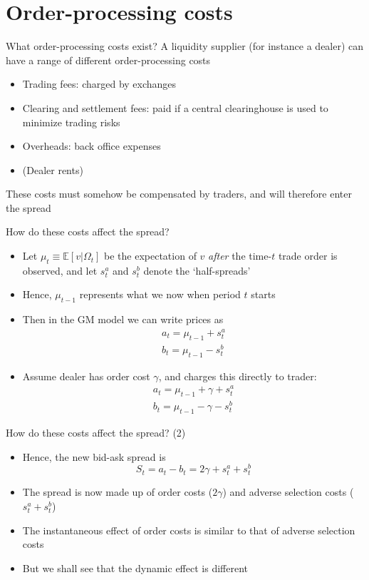 \documentclass[english,10pt]{beamer}
\begin{document}
\section{Order-processing costs}

\begin{frame}{What order-processing costs exist?}
	A liquidity supplier (for instance a dealer) can have a range of different order-processing costs
	\begin{itemize}
		\item Trading fees:  charged by exchanges
		\item Clearing and settlement fees:  paid if a central clearinghouse is used to minimize trading risks
		\item Overheads: back office expenses
		\item (Dealer rents)
	\end{itemize}
	These costs must somehow be compensated by traders, and will therefore enter the spread
\end{frame}


\begin{frame}{How do these costs affect the spread?}
	\begin{itemize}
		\item Let $\mu_t \equiv \mathbb{E}[v | \Omega_t]$ be the expectation of $v$ \textit{after} the time-$t$ trade order is observed, and let $s^a_t$ and $s^b_t$ denote the `half-spreads'
		\item Hence, $\mu_{t-1}$ represents what we now when period $t$ starts
		\item  Then in the GM model  we can write prices as
		\begin{align*}
		a_{t} = \mu_{t-1} +s^{a}_{t} \\
		b_{t} = \mu_{t-1} - s^{b}_{t}
		\end{align*}
		\item Assume dealer has order cost $\gamma$, and charges this directly to trader:
		\begin{align*}
		a_{t} = \mu_{t-1} + \gamma + s^{a}_{t} \\
		b_{t} = \mu_{t-1} - \gamma - s^{b}_{t}
		\end{align*}
	\end{itemize}
\end{frame}


\begin{frame}{How do these costs affect the spread? (2)}
	\begin{itemize}
		\item  Hence, the new bid-ask spread is 
		\[
		S_{t} = a_{t} - b_{t} = 2\gamma +s^{a}_{t}  + s^{b}_{t}
		\]
		\item The spread is now made up of order costs ($2\gamma$) and adverse selection costs ($s^{a}_{t}  + s^{b}_{t}$)
		\item The instantaneous effect of order costs is similar to that of adverse selection costs
		\item But we shall see that the dynamic effect is different
	\end{itemize}
\end{frame}
\end{document}
